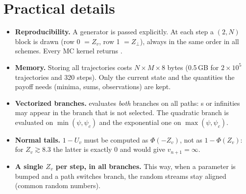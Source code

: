 \section{Practical details}
\begin{itemize}
\item \textbf{Reproducibility.} A generator  is passed explicitly. At each step a
$(2,N)$ block is drawn (row 0 $=Z_v$, row 1 $=Z_\perp$), always in the same order in all schemes. Every MC kernel
returns .
\item \textbf{Memory.} Storing all trajectories costs $N\times M\times8$ bytes (0.5\,GB for ${2\times10^5}$
trajectories and 320 steps). Only the current state and the quantities the payoff needs (minima, sums, observations)
are kept.
\item \textbf{Vectorized branches.}  evaluates \emph{both} branches on all paths: s or
infinities may appear in the branch that is not selected. The quadratic branch is evaluated on $\min(\psi,\psi_c)$ and
the exponential one on $\max(\psi,\psi_c)$.
\item \textbf{Normal tails.} $1-U_v$ must be computed as $\Phi(-Z_v)$, not as $1-\Phi(Z_v)$: for $Z_v\gtrsim8.3$ the
latter is exactly 0 and would give $v_{n+1}=\infty$.
\item \textbf{A single $Z_v$ per step, in all branches.} This way, when a parameter is bumped and a path switches
branch, the random streams stay aligned (common random numbers).
\end{itemize}

